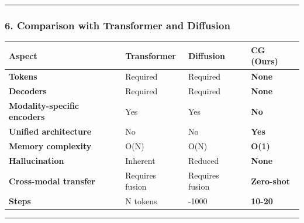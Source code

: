 \documentclass[
  11pt,
  a4paper,
]{article}
\begin{document}
\begin{center}\rule{0.5\linewidth}{0.5pt}\end{center}

\subsubsection{6. Comparison with Transformer and
Diffusion}\label{comparison-with-transformer-and-diffusion}

\begin{longtable}[]{@{}
  >{\raggedright\arraybackslash}p{}
  >{\raggedright\arraybackslash}p{}
  >{\raggedright\arraybackslash}p{}
  >{\raggedright\arraybackslash}p{}@{}}
\toprule\noalign{}
\begin{minipage}[b]{\linewidth}\raggedright
Aspect
\end{minipage} & \begin{minipage}[b]{\linewidth}\raggedright
Transformer
\end{minipage} & \begin{minipage}[b]{\linewidth}\raggedright
Diffusion
\end{minipage} & \begin{minipage}[b]{\linewidth}\raggedright
\textbf{CG (Ours)}
\end{minipage} \\
\midrule\noalign{}
\endhead
\bottomrule\noalign{}
\endlastfoot
\textbf{Tokens} & Required & Required & \textbf{None} \\
\textbf{Decoders} & Required & Required & \textbf{None} \\
\textbf{Modality-specific encoders} & Yes & Yes & \textbf{No} \\
\textbf{Unified architecture} & No & No & \textbf{Yes} \\
\textbf{Memory complexity} & O(N) & O(N) & \textbf{O(1)} \\
\textbf{Hallucination} & Inherent & Reduced & \textbf{None} \\
\textbf{Cross-modal transfer} & Requires fusion & Requires fusion &
\textbf{Zero-shot} \\
\textbf{Steps} & N tokens & 50-1000 & \textbf{10-20} \\
\end{longtable}

\begin{center}\rule{0.5\linewidth}{0.5pt}\end{center}
\end{document}
